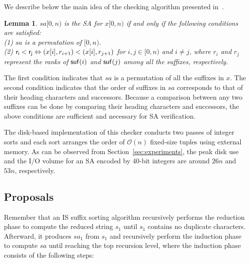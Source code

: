 \documentclass[10pt,journal,compsoc]{IEEEtran}
\newtheorem{lemma}[theorem]{Lemma}
\begin{document}
We describe below the main idea of the checking algorithm presented in~\cite{Dementiev2008a}.

\begin{lemma} \label{lemma:1}
	$sa[0, n)$ is the SA for $x[0, n)$ if and only if the following conditions are satisfied:\\
	(1) $sa$ is a permutation of $[0, n)$. \\	
	(2) ${\sf r_i < r_j} \Leftrightarrow (x[i], r_{i + 1}) < (x[i], r_{j + 1})$ for $ i, j \in [0, n)$ and $i\ne j$, where $r_i$ and $r_j$ represent the ranks of ${\sf suf}(i)$ and ${\sf suf}(j)$ among all the suffixes, respectively. \\
\end{lemma}

\begin{IEEEproof}The first condition indicates that $sa$ is a permutation of all the suffixes in $x$. The second condition indicates that the order of suffixes in $sa$ corresponds to that of their heading characters and successors. Because a comparison between any two suffixes can be done by comparing their heading characters and successors, the above conditions are sufficient and necessary for SA verification.

\end{IEEEproof}

The disk-based implementation of this checker conducts two passes of integer sorts and each sort arranges the order of $\mathcal{O}(n)$ fixed-size tuples using external memory. As can be observed from Section~\ref{sec:experiments}, the peak disk use and the I/O volume for an SA encoded by 40-bit integers are around $26n$ and $53n$, respectively.

\subsection{Proposals} \label{sec:checkers:proposals}

Remember that an IS suffix sorting algorithm recursively performs the reduction phase to compute the reduced string $s_1$ until $s_1$ contains no duplicate characters. Afterward, it produces $sa_1$ from $s_1$ and recursively perform the induction phase to compute $sa$ until reaching the top recursion level, where the induction phase consists of the following steps:
\end{document}
